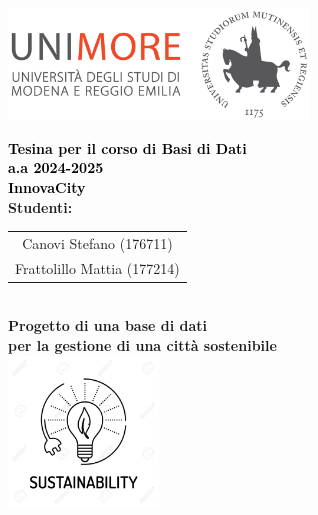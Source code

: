\begin{titlepage}
\begin{center}
    \includegraphics[width=0.6\textwidth]{images/Logo_C_Positivo_Colore.png}

    \vspace*{2cm}  %

    {\Huge \textbf{\textcolor{black}{Tesina per il corso di Basi di Dati \\ a.a 2024-2025 }}}\\[1.5cm]
    {\Huge \textbf{\textcolor{black}{InnovaCity}}}\\[0.5cm]
    {\Large \textbf{\textcolor{tudelftdarkblue}{Studenti:}}}\\[0.5cm]
    \begin{tabular}{c}
        \Large \textcolor{tudelftdarkblue}{Canovi Stefano (176711)} \\ 
        \Large \textcolor{tudelftdarkblue}{Frattolillo Mattia (177214)} \\ 
    \end{tabular}\\[2cm]
    
    \vspace*{1cm}
    {\Large \textbf{\textcolor{tudelftdarkblue}{Progetto di una base di dati\\ per la gestione di una città sostenibile }}}\\[1.3cm]
    \includegraphics[width=0.3\textwidth]{images/SOSTENIBILITA.png}

    \end{center}  %
\end{titlepage}
